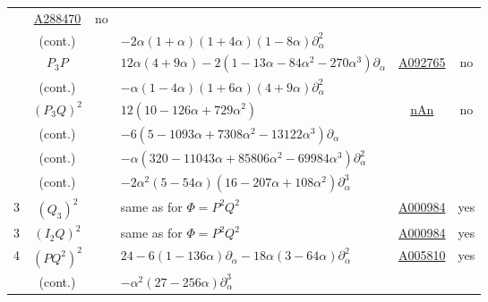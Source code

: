 \documentclass[nofootinbib,preprint]{revtex4-1}
\begin{document}
\begin{table}[p]
\begin{center}
\begin{tabularx}{\textwidth}{ c | c | c l | c   | c  }
            & \href{https://oeis.org/A288470}{A288470} 
            &  no \\
                & \tiny (cont.)       && \hspace{0.5cm}  $ -2 \alpha (1 + \alpha) (1 + 4 \alpha) (1 - 8 \alpha)\partial_{\alpha}^2$                   
            & &     \\
            &  $P_3 P $    && $12 \alpha (4 + 9 \alpha)- 2 (1 -13 \alpha - 84 \alpha^2 - 270 \alpha^3) \partial_{\alpha}$ 
            & \href{https://oeis.org/A092765}{A092765} 
            &  no  \\
                & \tiny (cont.)       && \hspace{0.5cm} $ -\alpha (1 - 4 \alpha) (1 + 6 \alpha) (4 + 9 \alpha)\partial_{\alpha}^2$                   
            & &     \\
            &  $(P_3 Q)^2$     && $12 (10 - 126 \alpha + 729 \alpha^2)$  
            & \href{https://oeis.org/AXXXXXX}{nAn} 
            &  no \\
                & \tiny (cont.)       && \hspace{0.5cm} $ -6 (5 - 1093 \alpha + 7308 \alpha^2 - 13122 \alpha^3)\partial_{\alpha}$                   
            & &     \\
                & \tiny (cont.)       && \hspace{0.5cm} $ -\alpha (320 - 11043 \alpha + 85806 \alpha^2 - 69984 \alpha^3)\partial_{\alpha}^2$                   
            & &     \\
                & \tiny (cont.)       && \hspace{0.5cm} $ -2 \alpha^2 (5 - 54 \alpha) (16 - 207 \alpha + 108 \alpha^2)\partial_{\alpha}^3$                   
            & &     \\
\hline
3           &  $(Q_3)^2$      && same as for $\Phi=P^2 Q^2$
            & \href{https://oeis.org/A000984}{A000984} 
            &  yes \\
3           &  $(I_2 Q)^2$   && same as for $\Phi=P^2 Q^2$
            & \href{https://oeis.org/A000984}{A000984} 
            &  yes \\
4           &  $(P Q^2)^2$  && $24-6 (1 - 136 \alpha)\partial_{\alpha}-18 \alpha (3 - 64 \alpha)\partial_{\alpha}^2$ 
            & \href{https://oeis.org/A005810}{A005810} 
            &  yes \\
            & \tiny (cont.)       && \hspace{0.5cm} $ -\alpha^2 (27 - 256 \alpha)\partial_\alpha^3$                   
            & &     \\

\end{tabularx}
\end{center}
\end{table}
\end{document}

